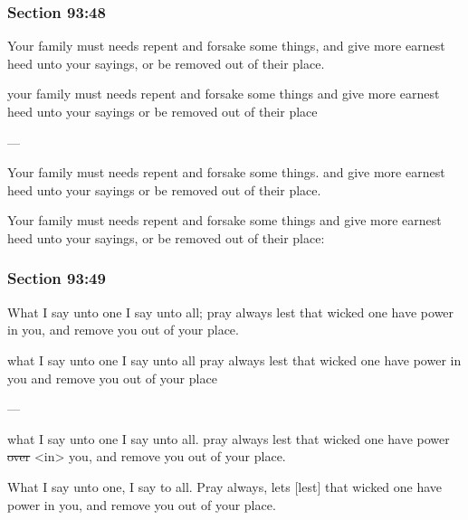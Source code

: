 	\subsubsection{Section 93:48} %
		\label{DC93-48}

		Your family must needs repent and forsake some things, and give more earnest heed unto your sayings, or be removed out of their place.

		\begin{framed}
		\scriptsize
			\begin{compactdesc}
				\item[JSP] your family must needs repent and forsake some things and give more earnest heed unto your sayings or be removed out of their place
				\item[BC] ---
				\item[RB2] Your family must needs repent and forsake some things. and give more earnest heed unto your sayings or be removed out of their place. 
				\item[RB1] Your family must needs repent and forsake some things and give more earnest heed unto your sayings, or be removed out of their place: 
			\end{compactdesc}
		\end{framed}

	\subsubsection{Section 93:49} %
		\label{DC93-49}

		What I say unto one I say unto all; pray always lest that wicked one have power in you, and remove you out of your place.

		\begin{framed}
		\scriptsize
			\begin{compactdesc}
				\item[JSP] what I say unto one I say unto all pray always lest that wicked one have power in you and remove you out of your place
				\item[BC] ---
				\item[RB2] what I say unto one I say unto all. pray always lest that wicked one have power \sout{over} <in> you, and remove you out of your place. 
				\item[RB1] What I say unto one, I say to all. Pray always, lets [lest] that wicked one have power in you, and remove you out of your place. 
			\end{compactdesc}
		\end{framed}

